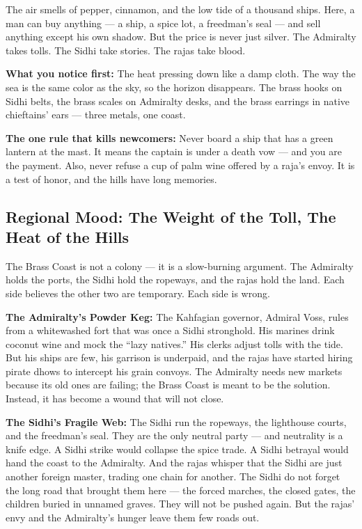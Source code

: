 \begin{tcolorbox}[colback=black!3,colframe=blue!60!black,title={Theme \& Atmosphere},breakable]
The air smells of pepper, cinnamon, and the low tide of a thousand ships. Here, a man can buy anything --- a ship, a spice lot, a freedman's seal --- and sell anything except his own shadow. But the price is never just silver. The Admiralty takes tolls. The Sidhi take stories. The rajas take blood.

\vspace{2mm}
\textbf{What you notice first:} The heat pressing down like a damp cloth. The way the sea is the same color as the sky, so the horizon disappears. The brass hooks on Sidhi belts, the brass scales on Admiralty desks, and the brass earrings in native chieftains' ears --- three metals, one coast.

\textbf{The one rule that kills newcomers:} Never board a ship that has a green lantern at the mast. It means the captain is under a death vow --- and you are the payment. Also, never refuse a cup of palm wine offered by a raja's envoy. It is a test of honor, and the hills have long memories.
\end{tcolorbox}

\subsection*{Regional Mood: The Weight of the Toll, The Heat of the Hills}

The Brass Coast is not a colony --- it is a slow-burning argument. The Admiralty holds the ports, the Sidhi hold the ropeways, and the rajas hold the land. Each side believes the other two are temporary. Each side is wrong.

\noindent
\textbf{The Admiralty's Powder Keg:} The Kahfagian governor, Admiral Voss, rules from a whitewashed fort that was once a Sidhi stronghold. His marines drink coconut wine and mock the ``lazy natives.'' His clerks adjust tolls with the tide. But his ships are few, his garrison is underpaid, and the rajas have started hiring pirate dhows to intercept his grain convoys. The Admiralty needs new markets because its old ones are failing; the Brass Coast is meant to be the solution. Instead, it has become a wound that will not close.

\noindent
\textbf{The Sidhi's Fragile Web:} The Sidhi run the ropeways, the lighthouse courts, and the freedman's seal. They are the only neutral party --- and neutrality is a knife edge. A Sidhi strike would collapse the spice trade. A Sidhi betrayal would hand the coast to the Admiralty. And the rajas whisper that the Sidhi are just another foreign master, trading one chain for another. The Sidhi do not forget the long road that brought them here --- the forced marches, the closed gates, the children buried in unnamed graves. They will not be pushed again. But the rajas' envy and the Admiralty's hunger leave them few roads out.

